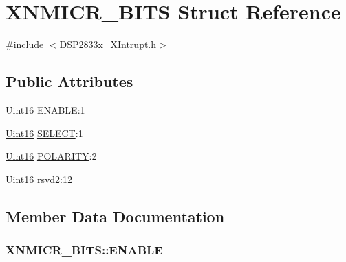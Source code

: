 \hypertarget{struct_x_n_m_i_c_r___b_i_t_s}{}\section{X\+N\+M\+I\+C\+R\+\_\+\+B\+I\+T\+S Struct Reference}
\label{struct_x_n_m_i_c_r___b_i_t_s}


{\ttfamily \#include $<$D\+S\+P2833x\+\_\+\+X\+Intrupt.\+h$>$}

\subsection*{Public Attributes}
\begin{DoxyCompactItemize}
\item 
\hyperlink{_d_s_p2833x___device_8h_a59a9f6be4562c327cbfb4f7e8e18f08b}{Uint16} \hyperlink{struct_x_n_m_i_c_r___b_i_t_s_acf9e08e60813d7ddf20b502bae094173}{E\+N\+A\+B\+L\+E}\+:1
\item 
\hyperlink{_d_s_p2833x___device_8h_a59a9f6be4562c327cbfb4f7e8e18f08b}{Uint16} \hyperlink{struct_x_n_m_i_c_r___b_i_t_s_a1b9e9b4b98c39f2215b5e498661389fa}{S\+E\+L\+E\+C\+T}\+:1
\item 
\hyperlink{_d_s_p2833x___device_8h_a59a9f6be4562c327cbfb4f7e8e18f08b}{Uint16} \hyperlink{struct_x_n_m_i_c_r___b_i_t_s_af66cb1b0a221d0e29cb647874437eea8}{P\+O\+L\+A\+R\+I\+T\+Y}\+:2
\item 
\hyperlink{_d_s_p2833x___device_8h_a59a9f6be4562c327cbfb4f7e8e18f08b}{Uint16} \hyperlink{struct_x_n_m_i_c_r___b_i_t_s_a70f36d4092d51d74d46f083122cf8dfd}{rsvd2}\+:12
\end{DoxyCompactItemize}


\subsection{Member Data Documentation}
\hypertarget{struct_x_n_m_i_c_r___b_i_t_s_acf9e08e60813d7ddf20b502bae094173}{}
\subsubsection[{E\+N\+A\+B\+L\+E}]{ X\+N\+M\+I\+C\+R\+\_\+\+B\+I\+T\+S\+::\+E\+N\+A\+B\+L\+E}\label{struct_x_n_m_i_c_r___b_i_t_s_acf9e08e60813d7ddf20b502bae094173}
\hypertarget{struct_x_n_m_i_c_r___b_i_t_s_af66cb1b0a221d0e29cb647874437eea8}{}
